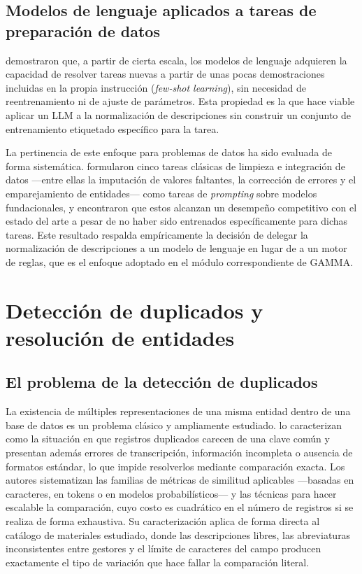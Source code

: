 \subsection{Modelos de lenguaje aplicados a tareas de preparación de datos}
 demostraron que, a partir de cierta escala, los modelos de lenguaje adquieren la capacidad de resolver tareas nuevas a partir de unas pocas demostraciones incluidas en la propia instrucción (\textit{few-shot learning}), sin necesidad de reentrenamiento ni de ajuste de parámetros. Esta propiedad es la que hace viable aplicar un LLM a la normalización de descripciones sin construir un conjunto de entrenamiento etiquetado específico para la tarea.

La pertinencia de este enfoque para problemas de datos ha sido evaluada de forma sistemática.  formularon cinco tareas clásicas de limpieza e integración de datos —entre ellas la imputación de valores faltantes, la corrección de errores y el emparejamiento de entidades— como tareas de \textit{prompting} sobre modelos fundacionales, y encontraron que estos alcanzan un desempeño competitivo con el estado del arte a pesar de no haber sido entrenados específicamente para dichas tareas. Este resultado respalda empíricamente la decisión de delegar la normalización de descripciones a un modelo de lenguaje en lugar de a un motor de reglas, que es el enfoque adoptado en el módulo correspondiente de GAMMA.

\section{Detección de duplicados y resolución de entidades}

\subsection{El problema de la detección de duplicados}
La existencia de múltiples representaciones de una misma entidad dentro de una base de datos es un problema clásico y ampliamente estudiado.  lo caracterizan como la situación en que registros duplicados carecen de una clave común y presentan además errores de transcripción, información incompleta o ausencia de formatos estándar, lo que impide resolverlos mediante comparación exacta. Los autores sistematizan las familias de métricas de similitud aplicables —basadas en caracteres, en tokens o en modelos probabilísticos— y las técnicas para hacer escalable la comparación, cuyo costo es cuadrático en el número de registros si se realiza de forma exhaustiva. Su caracterización aplica de forma directa al catálogo de materiales estudiado, donde las descripciones libres, las abreviaturas inconsistentes entre gestores y el límite de caracteres del campo producen exactamente el tipo de variación que hace fallar la comparación literal.

